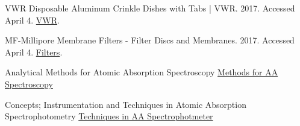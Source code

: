\documentclass[12pt]{../SOP2}
\begin{document}
\NP VWR Disposable Aluminum Crinkle Dishes with Tabs | VWR. 2017. Accessed April 4. \href{https://us.vwr.com/store/catalog/product.jsp?product_id=4622693}{VWR}.

\NP MF-Millipore Membrane Filters - Filter Discs and Membranes. 2017. Accessed April 4. \href{https://www.emdmillipore.com/US/en/product/MF-Millipore%E2%84%A2-Membrane-Filters,MM_NF-C152}{Filters}.

\NP Analytical Methods for Atomic Absorption Spectroscopy \href{http://www1.lasalle.edu/~prushan/Intrumental%20Analysis_files/AA-Perkin%20Elmer%20guide%20to%20all!.pdf}{Methods for AA Spectroscopy}

\NP Concepts; Instrumentation and Techniques in Atomic Absorption Spectrophotometry \href{http://www.ufjf.br/baccan/files/2011/05/AAS-Perkin1.pdf}{Techniques in AA Spectrophotmeter}
\end{document}
